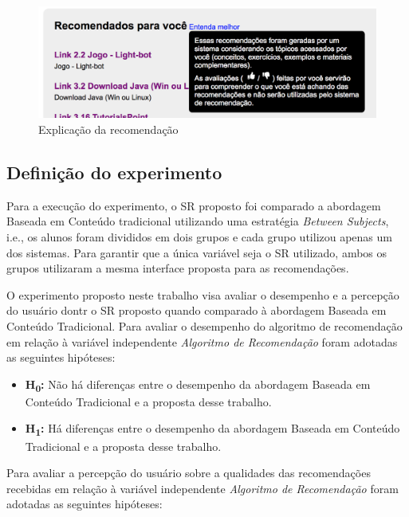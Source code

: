 \begin{figure}[htb]
  \caption{\label{fig:adaptweb-proposta-explicacao}Explicação da recomendação}
  \begin{center}
      \includegraphics[scale=0.6]{./Figuras/explicacao-das-recomendacoes.png}
  \end{center}
\end{figure}

\subsection{Definição do experimento}\label{subsection:definicao-experimento}

Para a execução do experimento, o SR proposto foi comparado a abordagem Baseada em Conteúdo tradicional utilizando uma
estratégia \textit{Between Subjects}, i.e., os alunos foram divididos em dois grupos e cada grupo utilizou apenas
um dos sistemas. Para garantir que a única variável seja o SR utilizado, ambos os grupos utilizaram a mesma
interface proposta para as recomendações.

O experimento proposto neste trabalho visa avaliar o desempenho e a percepção do usuário dontr o SR proposto quando
comparado à abordagem Baseada em Conteúdo Tradicional. Para avaliar o desempenho do algoritmo de recomendação em relação
à variável independente \textit{Algoritmo de Recomendação} foram adotadas as seguintes hipóteses:

\begin{itemize}
\item \textbf{H\textsubscript{0}:} Não há diferenças entre o desempenho da abordagem Baseada em Conteúdo
Tradicional e a proposta desse trabalho.
\item \textbf{H\textsubscript{1}:} Há diferenças entre o desempenho da abordagem Baseada em Conteúdo
Tradicional e a proposta desse trabalho.
\end{itemize}

Para avaliar a percepção do usuário sobre a qualidades das recomendações recebidas em relação
à variável independente \textit{Algoritmo de Recomendação} foram adotadas as seguintes hipóteses:


